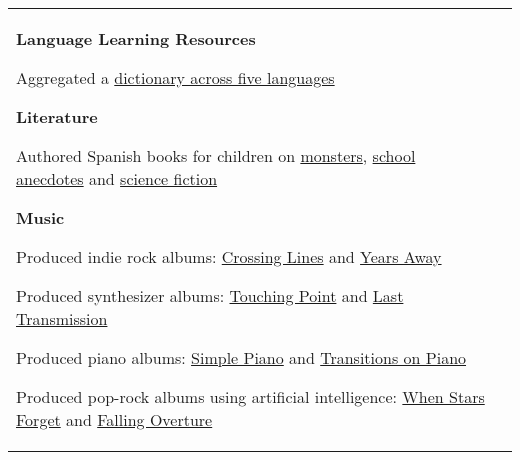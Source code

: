 \documentclass[letterpaper,10pt,oneside]{article}
\newcommand{\itemspacingtwo}{\vspace{0.08cm}}
\newenvironment{body}
{\par\par
\begin{longtable}{p{0.145\textwidth}p{0.81\textwidth}}}
{\par\end{longtable}\par}
\begin{document}
\begin{body}
\textbf{Language Learning Resources}
\begin{comp}
\item Aggregated a \href{https://github.com/lquesada/Lingvaro}{dictionary across five languages}
\end{comp}
\itemspacingtwo

\textbf{Literature}
\begin{comp}
\item Authored Spanish books for children on \href{https://www.amazon.es/dp/B0C47LFXDJ}{monsters}, \href{https://www.amazon.es/dp/B0CGKWWRY3}{school anecdotes} and \href{https://www.amazon.es/dp/B0CTXN78NH}{science fiction}
\end{comp}
\itemspacingtwo

\textbf{Music}
\begin{comp}
\item Produced indie rock albums: \href{https://open.spotify.com/album/1BspGnlv7cWS85sPZ4nfLr}{Crossing Lines} and \href{https://open.spotify.com/album/3JIpCmtM3DP1ehxE80Ufeg}{Years Away}
\item Produced synthesizer albums: \href{https://open.spotify.com/album/3wqaFP9BL2MGaSigExavsM}{Touching Point} and \href{https://open.spotify.com/album/6Im0Un3txvscirw0RBhZ7y}{Last Transmission}
\item Produced piano albums: \href{https://open.spotify.com/album/36yE0PeGFyDJtl4T127Bko}{Simple Piano} and \href{https://open.spotify.com/album/3TsZ2szcmFKWJ67yGMMwUJ}{Transitions on Piano}
\item Produced pop-rock albums using artificial intelligence: \href{https://open.spotify.com/album/1uvp7yDrgS1S9AV6HquElz}{When Stars Forget} and \href{https://open.spotify.com/album/5LbDf81WZi04id56sPD9xj}{Falling Overture}

\end{comp}

\end{body}
\end{document}
